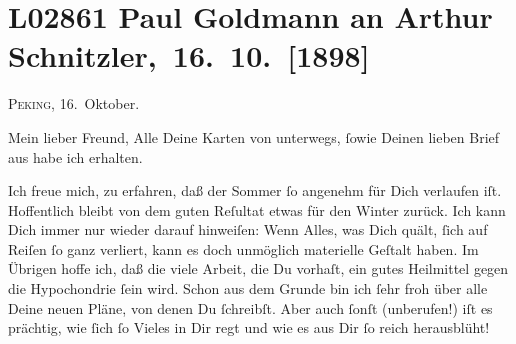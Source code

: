 

\section[ Paul Goldmann an Arthur Schnitzler, 16. 10. {[}1898{]}]{L02861 Paul Goldmann an Arthur Schnitzler, 16. 10. {[}1898{]}}
\nopagebreak{}
\rehead{ }\normalsize\beginnumbering{}
\toendnotes[C]{\smallbreak\pagebreak[2]}
\toendnotes[C]{\smallbreak}
\pstart
           \raggedleft{}{\pb}\textsc{Peking}, 16. Oktober.\pend
           
\pstart\center{}Mein lieber Freund,\pend\vspace{0.5em}
\pstart
           Alle Deine Karten von unterwegs, ſowie Deinen lieben Brief aus \label{K_L02861-1v}\label{K_L02861-1} habe
               ich erhalten.\pend
           
\pstart
           Ich freue mich, zu erfahren, daß der Sommer ſo angenehm für Dich verlaufen iſt.
               Hoffentlich bleibt von dem guten Reſultat etwas für den Winter zurück. \strikeout{\textcolor{gray}{×}} Ich kann Dich immer nur wieder darauf hinweiſen: Wenn Alles, was Dich quält,
               ſich auf Reiſen ſo ganz verliert, kann es doch unmöglich materielle Geſtalt haben. Im
               Übrigen hoffe ich, daß die viele Arbeit, die Du vorhaſt, ein gutes Heilmittel gegen
               die Hypochondrie ſein wird. Schon aus dem Grunde {\pb}bin ich ſehr froh über alle Deine neuen Pläne, von denen Du ſchreibſt. Aber auch
               ſonſt (unberufen!) iſt es prächtig, wie ſich ſo \strikeout{\textcolor{gray}{V}} Vieles in Dir regt und wie es aus Dir ſo reich herausblüht!\pend
           
